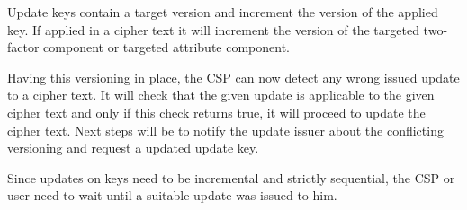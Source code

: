 Update keys contain a target version and increment the version of the applied key. If applied in a cipher text it will increment the version of the targeted two-factor component or targeted attribute component. 

Having this versioning in place, the CSP can now detect any wrong issued update to a cipher text. It will check that the given update is applicable to the given cipher text and only if this check returns true, it will proceed to update the cipher text. Next steps will be to notify the update issuer about the conflicting versioning and request a updated update key. 

Since updates on keys need to be incremental and strictly sequential, the CSP or user need to wait until a suitable update was issued to him.  